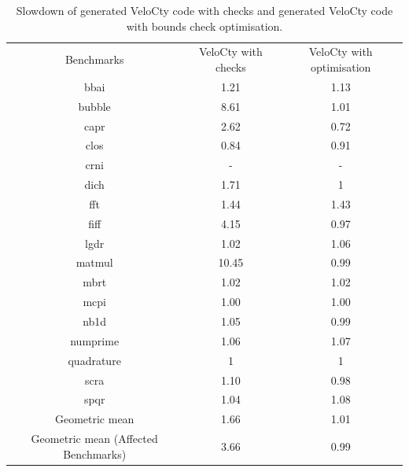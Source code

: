 \begin{table}[htbp]
\centering
\begin{tabular}{|c|c|c|}
\hline
Benchmarks                           & VeloCty with checks & VeloCty with optimisation \\ \hhline{|=|=|=|}
bbai                                 & 1.21   & 1.13         \\ \hline
bubble                               & 8.61   & 1.01         \\ \hline
capr                                 & 2.62    & 0.72        \\ \hline
clos                                 & 0.84  & 0.91        \\ \hline
crni                                 & -             & -                   \\ \hline
dich                                 & 1.71   & 1                   \\ \hline
fft                                  & 1.44   & 1.43         \\ \hline
fiff                                 & 4.15    & 0.97             \\ \hline
lgdr                                 & 1.02   & 1.06         \\ \hline
matmul                               & 10.45   & 0.99        \\ \hline
mbrt                                 & 1.02   & 1.02         \\ \hline
mcpi                                 & 1.00   & 1.00         \\ \hline
nb1d                                 & 1.05   & 0.99        \\ \hline
numprime                             & 1.06   & 1.07         \\ \hline
quadrature                           & 1             & 1                   \\ \hline
scra                                 & 1.10   & 0.98        \\ \hline
spqr                                 & 1.04   & 1.08         \\ \hline
Geometric mean                       & 1.66   & 1.01         \\ \hline
Geometric mean (Affected Benchmarks) & 3.66   & 0.99      \\ \hline
\end{tabular}
\caption{Slowdown of generated VeloCty code with checks and generated VeloCty code with bounds check optimisation. }
\label{tab:CwvsCbc}
\end{table}
